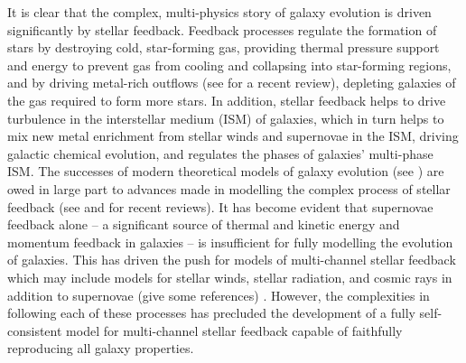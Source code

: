 \documentclass[twocolumn]{aastex62}
\begin{document}
It is clear that the complex, multi-physics story of galaxy evolution is driven significantly by stellar feedback. Feedback processes regulate the formation of stars by destroying cold, star-forming gas, providing thermal pressure support and energy to prevent gas from cooling and collapsing into star-forming regions, and by driving metal-rich outflows (see \citet{Zhang2018} for a recent review), depleting galaxies of the gas required to form more stars. In addition, stellar feedback helps to drive turbulence in the interstellar medium (ISM) of galaxies, which in turn helps to mix new metal enrichment from stellar winds and supernovae in the ISM, driving galactic chemical evolution, and regulates the phases of galaxies' multi-phase ISM. The successes of modern theoretical models of galaxy evolution (see \citet{Vogelsberger2020}) are owed in large part to advances made in modelling the complex process of stellar feedback (see \citet{SomervilleDave2015} and \citet{NaabOstriker2017} for recent reviews). It has become evident that supernovae feedback alone -- a significant source of thermal and kinetic energy and momentum feedback in galaxies -- is insufficient for fully modelling the evolution of galaxies. This has driven the push for models of multi-channel stellar feedback which may include models for stellar winds, stellar radiation, and cosmic rays in addition to supernovae (give some references) \citep[e.g.][]{FIRE2,Hopkins2020}. However, the complexities in following each of these processes has precluded the development of a fully self-consistent model for multi-channel stellar feedback capable of faithfully reproducing all galaxy properties. 
\end{document}
